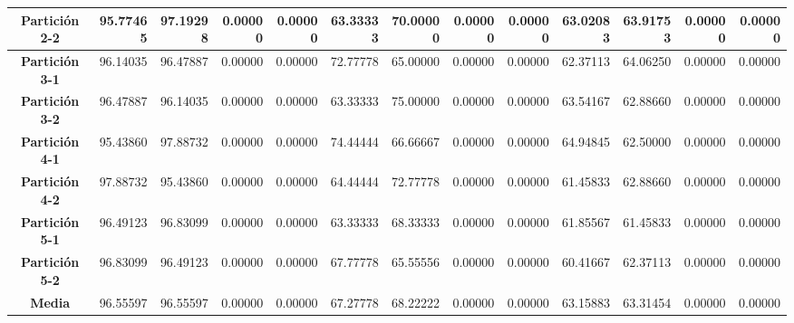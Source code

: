\documentclass[a4paper,11pt]{article}
\begin{document}
\begin{table}[htbp]
\begin{adjustbox}{width=1.1\textwidth}
\begin{tabular}{|c|r|r|r|r|r|r|r|r|r|r|r|r|}
    \textbf{Partición 2-2} & 95.77465 & 97.19298 & 0.00000 & 0.00000 & 63.33333 & 70.00000 & 0.00000 & 0.00000 & 63.02083 & 63.91753 & 0.00000 & 0.00000 \\ \hline
    \textbf{Partición 3-1} & 96.14035 & 96.47887 & 0.00000 & 0.00000 & 72.77778 & 65.00000 & 0.00000 & 0.00000 & 62.37113 & 64.06250 & 0.00000 & 0.00000 \\ \hline
    \textbf{Partición 3-2} & 96.47887 & 96.14035 & 0.00000 & 0.00000 & 63.33333 & 75.00000 & 0.00000 & 0.00000 & 63.54167 & 62.88660 & 0.00000 & 0.00000 \\ \hline
    \textbf{Partición 4-1} & 95.43860 & 97.88732 & 0.00000 & 0.00000 & 74.44444 & 66.66667 & 0.00000 & 0.00000 & 64.94845 & 62.50000 & 0.00000 & 0.00000 \\ \hline
    \textbf{Partición 4-2} & 97.88732 & 95.43860 & 0.00000 & 0.00000 & 64.44444 & 72.77778 & 0.00000 & 0.00000 & 61.45833 & 62.88660 & 0.00000 & 0.00000 \\ \hline
    \textbf{Partición 5-1} & 96.49123 & 96.83099 & 0.00000 & 0.00000 & 63.33333 & 68.33333 & 0.00000 & 0.00000 & 61.85567 & 61.45833 & 0.00000 & 0.00000 \\ \hline
    \textbf{Partición 5-2} & 96.83099 & 96.49123 & 0.00000 & 0.00000 & 67.77778 & 65.55556 & 0.00000 & 0.00000 & 60.41667 & 62.37113 & 0.00000 & 0.00000 \\ \hline
    \textbf{Media} & 96.55597 & 96.55597 & 0.00000 & 0.00000 & 67.27778 & 68.22222 & 0.00000 & 0.00000 & 63.15883 & 63.31454 & 0.00000 & 0.00000 \\ \hline
    \end{tabular}
    \end{adjustbox}
    \label{NN3}
  \end{table}
  
\end{document}
